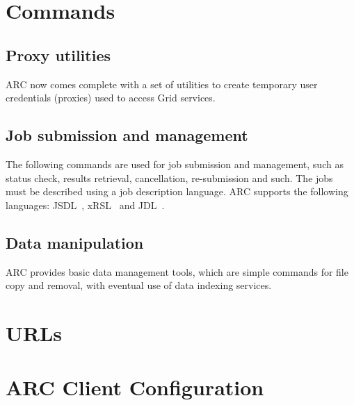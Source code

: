 \documentclass{book}
\begin{document}
\chapter{Commands} \label{sec:cli} 

\section{Proxy utilities} \label{sec:proxy}
 ARC now comes complete with a set of utilities to create
temporary user credentials (proxies) used to access Grid services.



\section{Job submission and management} \label{sec:ui} 
The following commands are used for job submission and management,
such as status check, results retrieval, cancellation, re-submission
and such. The jobs must be described using a job description language. ARC
supports the following languages: JSDL~\cite{jsdl}, xRSL~\cite{xrsl} and
JDL~\cite{jdl}.



\section{Data manipulation} \label{sec:dm} 
 ARC provides basic data management tools,
which are simple commands for file copy and removal, with eventual use
of data indexing services.



%

%


\chapter{URLs}\label{sec:urls}


\chapter{ARC Client Configuration} \label{sec:client.conf} 



\printindex
\end{document}
